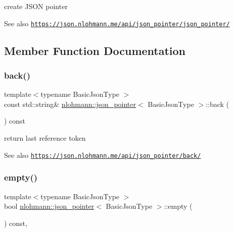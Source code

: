 create J\+S\+ON pointer 

\begin{DoxySeeAlso}{See also}
\href{https://json.nlohmann.me/api/json_pointer/json_pointer/}{\tt https\+://json.\+nlohmann.\+me/api/json\+\_\+pointer/json\+\_\+pointer/} 
\end{DoxySeeAlso}


\subsection{Member Function Documentation}
\mbox{\label{classnlohmann_1_1json__pointer_a213bc67c32a30c68ac6bf06f5195d482}} 
\subsubsection{\texorpdfstring{back()}{back()}}
{\footnotesize\ttfamily template$<$typename Basic\+Json\+Type $>$ \\
const std\+::string\& \hyperlink{classnlohmann_1_1json__pointer}{nlohmann\+::json\+\_\+pointer}$<$ Basic\+Json\+Type $>$\+::back (\begin{DoxyParamCaption}{ }\end{DoxyParamCaption}) const\hspace{0.3cm}{\ttfamily [inline]}}



return last reference token 

\begin{DoxySeeAlso}{See also}
\href{https://json.nlohmann.me/api/json_pointer/back/}{\tt https\+://json.\+nlohmann.\+me/api/json\+\_\+pointer/back/} 
\end{DoxySeeAlso}
\mbox{\label{classnlohmann_1_1json__pointer_a649252bda4a2e75a0915b11a25d8bcc3}} 
\subsubsection{\texorpdfstring{empty()}{empty()}}
{\footnotesize\ttfamily template$<$typename Basic\+Json\+Type $>$ \\
bool \hyperlink{classnlohmann_1_1json__pointer}{nlohmann\+::json\+\_\+pointer}$<$ Basic\+Json\+Type $>$\+::empty (\begin{DoxyParamCaption}{ }\end{DoxyParamCaption}) const\hspace{0.3cm}{\ttfamily [inline]}, {\ttfamily [noexcept]}}



